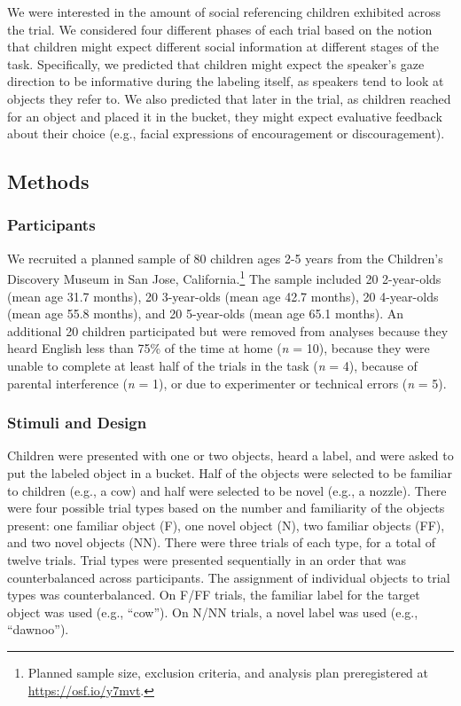 \documentclass[a4paper,man,apacite,floatsintext]{apa6}
\begin{document}
We were interested in the amount of social referencing children
exhibited across the trial. We considered four different phases of each
trial based on the notion that children might expect different social
information at different stages of the task. Specifically, we predicted
that children might expect the speaker's gaze direction to be
informative during the labeling itself, as speakers tend to look at
objects they refer to. We also predicted that later in the trial, as
children reached for an object and placed it in the bucket, they might
expect evaluative feedback about their choice (e.g., facial expressions
of encouragement or discouragement).

\subsection{Methods}\label{methods}

\subsubsection{Participants}\label{participants}

We recruited a planned sample of 80 children ages 2-5 years from the
Children's Discovery Museum in San Jose, California.\footnote{Planned
  sample size, exclusion criteria, and analysis plan preregistered at
  \url{https://osf.io/y7mvt}.} The sample included 20 2-year-olds (mean
age 31.7 months), 20 3-year-olds (mean age 42.7 months), 20 4-year-olds
(mean age 55.8 months), and 20 5-year-olds (mean age 65.1 months). An
additional 20 children participated but were removed from analyses
because they heard English less than 75\% of the time at home (\emph{n}
= 10), because they were unable to complete at least half of the trials
in the task (\emph{n} = 4), because of parental interference (\emph{n} =
1), or due to experimenter or technical errors (\emph{n} = 5).

\subsubsection{Stimuli and Design}\label{stimuli-and-design}

Children were presented with one or two objects, heard a label, and were
asked to put the labeled object in a bucket. Half of the objects were
selected to be familiar to children (e.g., a cow) and half were selected
to be novel (e.g., a nozzle). There were four possible trial types based
on the number and familiarity of the objects present: one familiar
object (F), one novel object (N), two familiar objects (FF), and two
novel objects (NN). There were three trials of each type, for a total of
twelve trials. Trial types were presented sequentially in an order that
was counterbalanced across participants. The assignment of individual
objects to trial types was counterbalanced. On F/FF trials, the familiar
label for the target object was used (e.g., ``cow''). On N/NN trials, a
novel label was used (e.g., ``dawnoo'').
\end{document}
